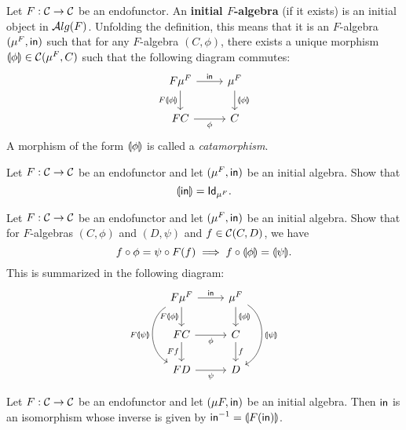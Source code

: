 \begin{dfn}\label{dfn:initial-alg}
  Let $F:\CC\to\CC$ be an endofunctor. An \textbf{initial $F$-algebra} (if it exists) is an initial object in $\ALG{F}$.
  Unfolding the definition, this means that it is an $F$-algebra $(\Initalg{F}, \In)$ such that for any $F$-algebra $(C,\phi)$, there exists a unique morphism $\catam{\phi} \in \CHom{\CC}{\Initalg{F}}{C}$ such that the following diagram commutes:
\begin{equation}\label{eq:initial-f-alg}
\begin{tikzcd}
{F\Initalg{F}} 
\arrow[r, "\In"] 
\arrow[d,swap, "F\catam{\phi}"]
& {\Initalg{F}} 
\arrow[d, "\catam{\phi}"] 
\\
FC
\arrow[r, swap, "\phi"] 
& C
\end{tikzcd}
\end{equation}
A morphism of the form $\catam{\phi}$ is called a \textit{catamorphism}.
\end{dfn}

\begin{exer}
  Let $F:\CC\to\CC$ be an endofunctor and let $(\Initalg F, \In)$ be an initial algebra. Show that
  \[\catam{\In} = \Id[\Initalg{F}].\]
\end{exer}

\begin{exer}\label{exer:fusion-property}
  Let $F:\CC\to\CC$ be an endofunctor and let $(\Initalg F, \In)$ be an initial algebra. Show that
  for $F$-algebras $(C,\phi)$ and $(D,\psi)$ and $f\in\CHom{\CC}{C}{D}$, we have 
\[
\co{\phi}{f} = \co{F(f)}{\psi} \implies \co{\catam{\phi}}{f} = \catam{\psi}.
\]
This is summarized in the following diagram:
\begin{equation}\label{eq:initial-f-alg-composition}
\begin{tikzcd}
F\Initalg{F} 
\arrow[r, "\In"] 
\arrow[d,swap, "F\catam{\phi}"]
\ar[dd, bend right=60, "F\catam{\psi}"']
&
\Initalg{F}
\arrow[d, "\catam{\phi}"]
\ar[dd, bend left=60, "\catam{\psi}"]
\\
FC
\arrow[r, swap, "\phi"]
\ar[d, "Ff"'] 
&
C \ar[d, "f"]
\\
FD \ar[r, "\psi"']
&
D
\end{tikzcd}
\end{equation}

\end{exer}

\begin{exer} Let $F:\CC\to\CC$ be an endofunctor and let $(\mu F, \In)$ be an initial algebra.
  Then $\In$ is an isomorphism whose inverse is given by $\Inv{\In} = \catam{F(\In)}$.
\end{exer}

